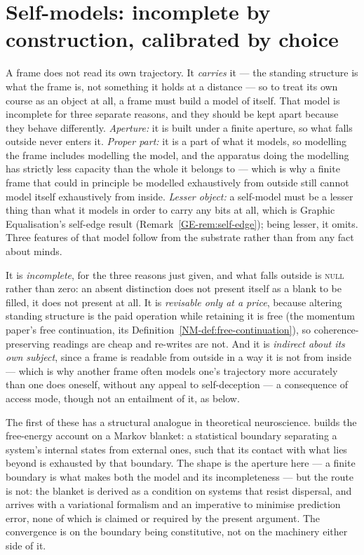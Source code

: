 \documentclass[11pt,a4paper]{article}
\theoremstyle{remark}\newtheorem{remark}[definition]{Remark}
\begin{document}
\section{Self-models: incomplete by construction, calibrated by choice}\label{sec:selfmodel}
A frame does not read its own trajectory. It \emph{carries} it --- the standing structure is what the frame is, not something it holds at a distance --- so to treat its own course as an object at all, a frame must build a model of itself. That model is incomplete for three separate reasons, and they should be kept apart because they behave differently. \emph{Aperture:} it is built under a finite aperture, so what falls outside never enters it. \emph{Proper part:} it is a part of what it models, so modelling the frame includes modelling the model, and the apparatus doing the modelling has strictly less capacity than the whole it belongs to --- which is why a finite frame that could in principle be modelled exhaustively from outside still cannot model itself exhaustively from inside. \emph{Lesser object:} a self-model must be a lesser thing than what it models in order to carry any bits at all, which is Graphic Equalisation's self-edge result (Remark~\ref{GE-rem:self-edge}); being lesser, it omits. Three features
of that model follow from the substrate rather than from any fact about minds.

It is \emph{incomplete}, for the three reasons just given, and what falls outside is \textsc{null} rather than zero: an absent distinction does not present itself as a blank to be filled, it does not present at all. It is \emph{revisable only at a price}, because altering standing structure is the paid operation while retaining it is free (the momentum paper's free continuation, its Definition~\ref{NM-def:free-continuation}), so coherence-preserving readings are cheap and re-writes are not. And it is \emph{indirect about its own subject}, since a frame is readable from outside in a way it is not from inside --- which is why another frame often models one's trajectory more accurately than one does oneself, without any appeal to self-deception --- a consequence of access mode, though not an entailment of it, as below.

The first of these has a structural analogue in theoretical neuroscience.
\citet{friston2010} builds the free-energy account on a Markov blanket: a statistical
boundary separating a system's internal states from external ones, such that its
contact with what lies beyond is exhausted by that boundary. The shape is the aperture
here --- a finite boundary is what makes both the model and its incompleteness --- but
the route is not: the blanket is derived as a condition on systems that resist
dispersal, and arrives with a variational formalism and an imperative to minimise
prediction error, none of which is claimed or required by the present argument. The
convergence is on the boundary being constitutive, not on the machinery either side of
it.
\end{document}
